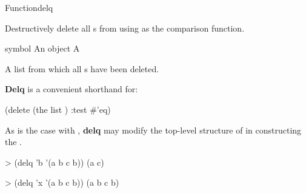\documentclass[10pt,twoside,english,pdftex]{article}
\begin{document}

\begin{functiondoc}{Function}{delq}{ \returns{}
    } 
%
  
\fnsyntax

\fnpurpose Destructively delete all s from  using 
as the comparison function.

\fnpackage {}

\fnmodule {}

\fnargs
\begin{args}{symbol}
\arg[item] An object
\arg[list] A 
\end{args}

\fnreturns A list from which all s have been deleted.

\fndescription \textbf{Delq} is a convenient shorthand for:
\begin{example}
  (delete  (the list ) :test #'eq)
\end{example}
As is the case with , \textbf{delq} may modify the top-level
structure of  in constructing the .

\fnexamples
\begin{example}
> (delq 'b '(a b c b))
(a c)
\end{example}
\begin{example}
> (delq 'x '(a b c b))
(a b c b)
\end{example}

\end{functiondoc}

\end{document}
